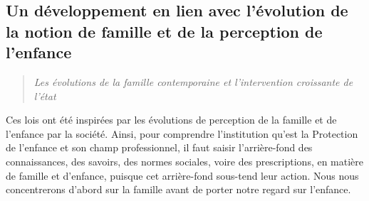 \documentclass[
  12,
  a4paper,
]{report}
\begin{document}
\hypertarget{un-duxe9veloppement-en-lien-avec-luxe9volution-de-la-notion-de-famille-et-de-la-perception-de-lenfance}{%
\subsection{Un développement en lien avec l'évolution de la notion de
famille et de la perception de
l'enfance}\label{un-duxe9veloppement-en-lien-avec-luxe9volution-de-la-notion-de-famille-et-de-la-perception-de-lenfance}}

\begin{quote}
\emph{Les évolutions de la famille contemporaine et l'intervention
croissante de l'état}
\end{quote}

Ces lois ont été inspirées par les évolutions de perception de la
famille et de l'enfance par la société. Ainsi, pour comprendre
l'institution qu'est la Protection de l'enfance et son champ
professionnel, il faut saisir l'arrière-fond des connaissances, des
savoirs, des normes sociales, voire des prescriptions, en matière de
famille et d'enfance, puisque cet arrière-fond sous-tend leur action.
Nous nous concentrerons d'abord sur la famille avant de porter notre
regard sur l'enfance.
\end{document}
